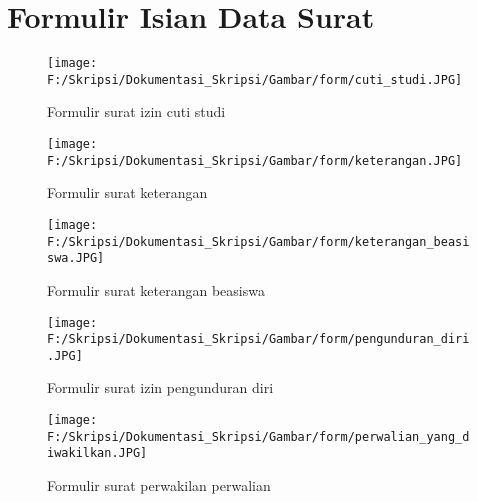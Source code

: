 \chapter{Formulir Isian Data Surat}
\label{lamp:G}

\begin{figure}[H]
	\centering
		\texttt{[image: F:/Skripsi/Dokumentasi\_Skripsi/Gambar/form/cuti\_studi.JPG]}
	\caption{Formulir surat izin cuti studi}
	\label{fig:formulir_surat_izin_cuti_studi}
\end{figure}

\begin{figure}[H]
	\centering
		\texttt{[image: F:/Skripsi/Dokumentasi\_Skripsi/Gambar/form/keterangan.JPG]}
	\caption{Formulir surat keterangan}
	\label{fig:formulir_surat_keterangan}
\end{figure}

\begin{figure}[H]
	\centering
		\texttt{[image: F:/Skripsi/Dokumentasi\_Skripsi/Gambar/form/keterangan\_beasiswa.JPG]}
	\caption{Formulir surat keterangan beasiswa}
	\label{fig:formulir_surat_keterangan_beasiswa}
\end{figure}

\begin{figure}[H]
	\centering
		\texttt{[image: F:/Skripsi/Dokumentasi\_Skripsi/Gambar/form/pengunduran\_diri.JPG]}
	\caption{Formulir surat izin pengunduran diri}
	\label{fig:formulir_surat_izin_pengunduran_diri}
\end{figure}

\begin{figure}[H]
	\centering
		\texttt{[image: F:/Skripsi/Dokumentasi\_Skripsi/Gambar/form/perwalian\_yang\_diwakilkan.JPG]}
	\caption{Formulir surat perwakilan perwalian}
	\label{fig:formulir_surat_perwakilan_perwalian}
\end{figure}